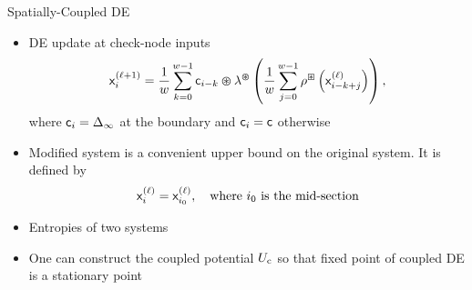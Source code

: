 \documentclass{beamer}
\newlength{\twocolwid}
\begin{document}
\begin{columns}[t]
\begin{column}{\twocolwid}
    \vspace{2cm}
    \begin{block}{Spatially-Coupled DE}
      \begin{itemize}
      \item\vspace{0.75cm} DE update at check-node inputs
        \begin{align*}
          \label{equation:scde_update_1_ldpc}
          \mathsf{x}_{i}^{(\ell+1)} = \frac{1}{w} \sum_{k=0}^{w-1} \mathsf{c}_{i-k} \varoast \lambda^{\varoast} \left(  \frac{1}{w} \sum_{j=0}^{w-1} \rho^{\boxast} \left( \mathsf{x}_{i-k+j}^{(\ell)} \right) \right) ,
        \end{align*}
        where $\mathsf{c}_i=\Delta_\infty$ at the boundary and $\mathsf{c}_i=\mathsf{c}$ otherwise
      \item\vspace{0.75cm} \alert{Modified system} is a convenient upper bound on the original system.
        It is defined by
        \begin{align*}
          \mathsf{x}_{i}^{(\ell)} = \mathsf{x}_{i_0}^{(\ell)},  \quad \text{where $i_0$ is the mid-section}
        \end{align*}
      \item\vspace{0.75cm} Entropies of two systems
        \vspace{1cm}
        \begin{center}
          \resizebox{18cm}{9cm}{
            
          }
        \end{center}
      \item One can construct the \alert{coupled potential} $U_\mathrm{c}$ so that fixed point of coupled DE is a stationary point
      \end{itemize}
    \end{block}


\end{column}
\end{columns}
\end{document}
